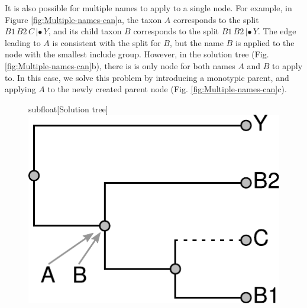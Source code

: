 \documentclass[english]{article}
\begin{document}
It is also possible for multiple names to apply to a single node. For
example, in Figure \ref{fig:Multiple-names-can}a, the taxon $A$
corresponds to the split $B1\,B2\,C\,|\bullet\,Y$, and its child taxon
$B$ corresponds to the split $B1\,B2\,|\bullet\,Y$. The edge leading
to $A$ is consistent with the split for $B$, but the name $B$ is
applied to the node with the smallest include group. However, in the
solution tree (Fig. \ref{fig:Multiple-names-can}b), there is is only
node for both names $A$ and $B$ to apply to. In this case, we solve
this problem by introducing a monotypic parent, and applying $A$ to
the newly created parent node (Fig. \ref{fig:Multiple-names-can}c).
\begin{figure}
\hfill{}
\hfill{}subfloat[Solution tree]{\includegraphics[scale=0.5]{Figures/names2nodes1/synth-shaded}}

\end{figure}
\end{document}
